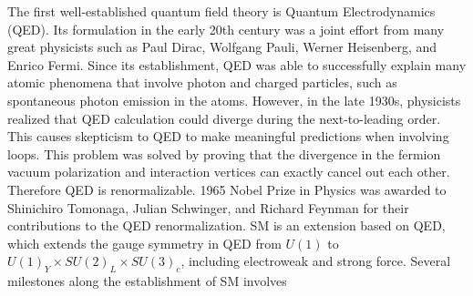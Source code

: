 The first well-established quantum field theory is Quantum Electrodynamics (QED). Its formulation in the early 20th century was a joint effort from many great physicists such as Paul Dirac, Wolfgang Pauli, Werner Heisenberg, and Enrico Fermi. Since its establishment, QED was able to successfully explain many atomic phenomena that involve photon and charged particles, such as spontaneous photon emission in the atoms. However, in the late 1930s, physicists realized that QED calculation could diverge during the next-to-leading order. This causes skepticism to QED to make meaningful predictions when involving loops. This problem was solved by proving that the divergence in the fermion vacuum polarization and interaction vertices can exactly cancel out each other. Therefore QED is renormalizable. 1965 Nobel Prize in Physics was awarded to Shinichiro Tomonaga, Julian Schwinger, and Richard Feynman for their contributions to the QED renormalization. SM is an extension based on QED, which extends the gauge symmetry in QED from $U(1)$ to $U(1)_Y \times SU(2)_L \times SU(3)_c$, including electroweak and strong force. Several milestones along the establishment of SM involves

